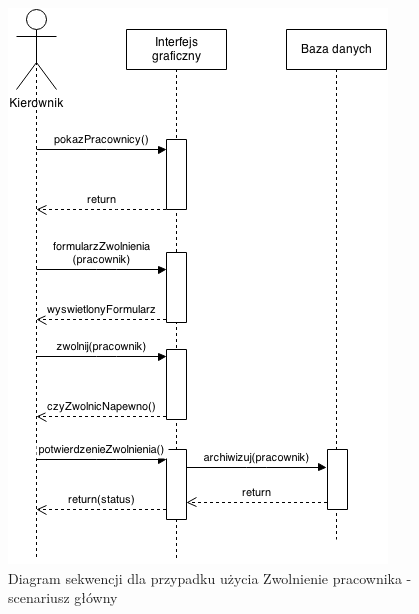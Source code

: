   \begin{figure}[H]
    \includegraphics[width=\textwidth,
    height=0.5\textheight]{graphics/UseCase/Pracownik/ZwolnieniePracownika.png}
  \caption{Diagram sekwencji dla przypadku użycia Zwolnienie pracownika -
  scenariusz główny}
\end{figure}